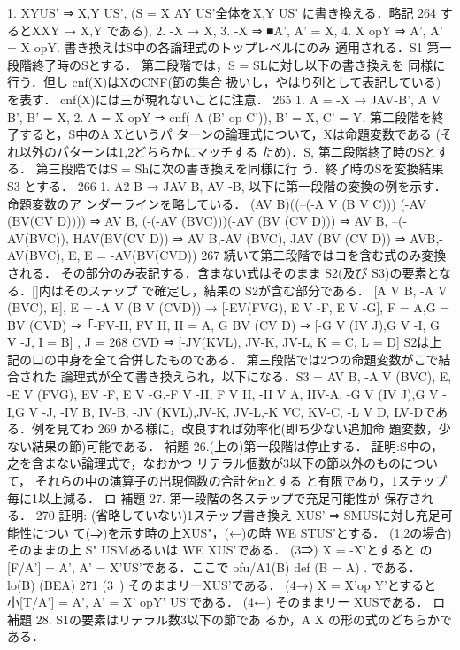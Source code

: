 \documentclass{ltjsarticle}
\theoremstyle{mystyle1}
\theoremstyle{mystyle3}
\theoremstyle{mystyle2}
\begin{document}
1. {XY}US' ⇒ {X,Y} US', (S = {X AY
}US'全体を{X,Y} US' に書き換える．略記
264
するとXXY → X,Y である), 2. -X → X, 3. -X ⇒ ■A', A' = X, 4. X opY ⇒ A', A' = X opY. 書き換えはS中の各論理式のトップレベルにのみ 適用される．S1 第一段階終了時のSとする． 第二段階では，S = SLに対し以下の書き換えを 同様に行う．但し cnf(X)はXのCNF(節の集合 扱いし，やはり列として表記している)を表す． cnf(X)には三が現れないことに注意．
265
1. A = -X → JAV-B', A V B', B' = X, 2. A = X opY ⇒
cnf( A (B' op C')), B' = X, C' = Y. 第二段階を終了すると，S中のA Xというパ ターンの論理式について，Xは命題変数である (それ以外のパターンは1,2どちらかにマッチする ため)．S, 第二段階終了時のSとする． 第三段階ではS = Shに次の書き換えを同様に行
う．終了時のSを変換結果 S3 とする．
266
1. A2 B → JAV B, AV -B,
以下に第一段階の変換の例を示す．命題変数のア ンダーラインを略している．
(AV B)((--(-A V (B V C)))  (-AV
(BV(CV D)))) ⇒ AV B, (-(-AV (BVC)))(-AV (BV
(CV D))) ⇒ AV B, --(-AV(BVC)), HAV(BV(CV D)) ⇒ AV B,-AV (BVC), JAV (BV (CV D)) ⇒ AVB,-AV(BVC), E, E = -AV(BV(CVD))
267
続いて第二段階ではコを含む式のみ変換される． その部分のみ表記する．含まない式はそのまま S2(及び S3)の要素となる．[]内はそのステップ で確定し，結果の S2が含む部分である．
[A V B, -A V (BVC), E],
E = -A V (B V (CVD)) → [-EV(FVG), E V -F, E V -G],
F = A,G = BV (CVD) ⇒「-FV-H, FV H, H = A, G BV (CV D) ⇒ [-G V (IV J),G V -I, G V -J, I = B] , J =
268
CVD ⇒ [-JV(KVL), JV-K, JV-L, K = C, L = D]
S2は上記の口の中身を全て合併したものである． 第三段階では2つの命題変数がこで結合された 論理式が全て書き換えられ，以下になる．S3 = {AV B, -A V (BVC), E, -E V (FVG), EV -F, E V -G,-F V -H, F V H, -H V A, HV-A, -G V (IV J),G V -I,G V -J, -IV B, IV-B, -JV (KVL),JV-K, JV-L,-K VC, KV-C, -L V D, LV-D}である．例を見てわ
269
かる様に，改良すれば効率化(即ち少ない追加命 題変数，少ない結果の節)可能である．
補題 26.(上の)第一段階は停止する．
証明:S中の，之を含まない論理式で，なおかつ リテラル個数が3以下の節以外のものについて， それらの中の演算子の出現個数の合計をnとする と有限であり，1ステップ毎に1以上減る． ロ
補題 27. 第一段階の各ステップで充足可能性が 保存される．
270
証明: (省略していない)1ステップ書き換え {X}US' ⇒ SMUSに対し充足可能性につい て(⇒)を示す時の上{X}US"，(←)の時 WE STUS'とする． (1,2の場合) そのままの上 S" USMあるいは WE {X}US'である． (3⇒) X = -X'とすると の[F/A'] = { A', A' = X'}US'である．ここで ofu/A1(B) def  (B = A) .
である． lo(B) (BEA)
271
(3~) そのままリー{X}US'である． (4→) X = X'op Y'とすると 小[T/A'] = {A', A' = X' opY'} US'である． (4←) そのままリー {X}USである． ロ 補題 28. S1の要素はリテラル数3以下の節であ るか，A X の形の式のどちらかである．
\end{document}

